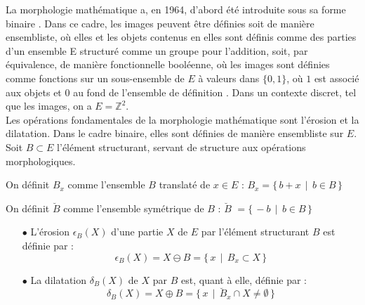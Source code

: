 La morphologie mathématique a, en 1964, d'abord été introduite sous sa forme binaire \cite{Serra_1986}. Dans ce cadre, les images peuvent être définies soit de manière ensembliste, où elles et les objets contenus en elles sont définis comme des parties d'un ensemble E structuré comme un groupe pour l'addition, soit, par équivalence, de manière fonctionnelle booléenne, où les images sont définies comme fonctions sur un sous-ensemble de $E$ à valeurs dans $\{0,1\}$, où $1$ est associé aux objets et $0$ au fond de l'ensemble de définition \cite{Serra_1983}. Dans un contexte discret, tel que les images, on a $E=\mathbb{Z}^2$. \\

\vspace{-1.6mm}
Les opérations fondamentales de la morphologie mathématique sont l'érosion et la dilatation. Dans le cadre binaire, elles sont définies de manière ensembliste sur $E$. \\

\vspace{-1.6mm}
\noindent Soit $B \subset E$ l'élément structurant, servant de structure aux opérations morphologiques.

\noindent On définit $B_x$ comme l'ensemble $B$ translaté de $x \in E$ : \hspace{0.444cm} $B_x = \{ \, b+x \, \mid \, b \in B \, \}$

\noindent On définit $\breve{B}$ \hspace{0.7mm} comme l'ensemble symétrique de $B$ : \hspace{1.03cm} $\breve{B}$ \hspace{0.02mm} $= \{ \, -b \, \mid \, b \in B \, \}$

\vspace{0.4cm}
\begin{itemize}[leftmargin=*]
    \item[$\bullet$] L'érosion $\epsilon_B(X)$ d'une partie $X$ de $E$ par l'élément structurant $B$ est définie par : 
    \begin{equation}
        \epsilon_B(X) = X \ominus B = \{ \, x \, \mid \, B_x \subset X \, \}
        \label{binary_erosion}
    \end{equation}
\end{itemize}
\vspace{0cm}
\begin{itemize}[leftmargin=*]
    \item[$\bullet$] La dilatation $\delta_B(X)$ de $X$ par $B$ est, quant à elle, définie par : 
    \begin{equation}
        \delta_B(X) = X \oplus B = \{ \, x \, \mid \, \breve{B}_x \cap X \neq \emptyset \, \}
        \label{binary_dilation}
    \end{equation}
\end{itemize}

